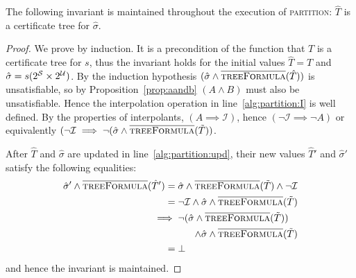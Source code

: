 \begin{proposition}
    The following invariant is maintained throughout the execution of \textsc{partition}: $\hat{T}$ is a certificate tree for $\hat{\sigma}$.
\end{proposition}
\begin{proof}
    We prove by induction. It is a precondition of the function that $T$ is a certificate tree for $s$, thus the invariant holds for the initial values $\hat{T} = T$ and $\hat{\sigma} = s(2^{\mathcal{S}} \times 2^{\mathcal{U}})$.  By the induction hypothesis $(\hat{\sigma} \land \textsc{$\overline{\mbox{treeFormula}}$}(\hat{T}))$ is unsatisfiable, so by Proposition~\ref{prop:aandb} $(A \land B)$ must also be unsatisfiable.  Hence the interpolation operation in line~\ref{alg:partition:I} is well defined.  By the properties of interpolants, $(A \implies \mathcal{I})$, hence $(\neg \mathcal{I} \implies \neg A)$ or equivalently $(\neg\mathcal{I} \implies \neg (\hat{\sigma} \land \textsc{$\overline{\mbox{treeFormula}}$}(\tilde{T}))$.

    After $\hat{T}$ and $\hat{\sigma}$ are updated in line~\ref{alg:partition:upd}, their new values $\hat{T}'$ and $\hat{\sigma}'$ satisfy the following equalities: \begin{align*}
        \hat{\sigma}' \land \opptf(\hat{T}') ={}& \hat{\sigma} \land \opptf(\tilde{T}) \land \neg\mathcal{I} \\
        ={}& \neg\mathcal{I} \land \hat{\sigma} \land \opptf(\tilde{T}) \\
        \implies{}& \neg (\hat{\sigma} \land \opptf(\tilde{T})) \\
                  & \pushright{\land \hat{\sigma} \land \opptf(\tilde{T})} \\
        ={}& \bot
\end{align*} and hence the invariant is maintained.
\end{proof}

